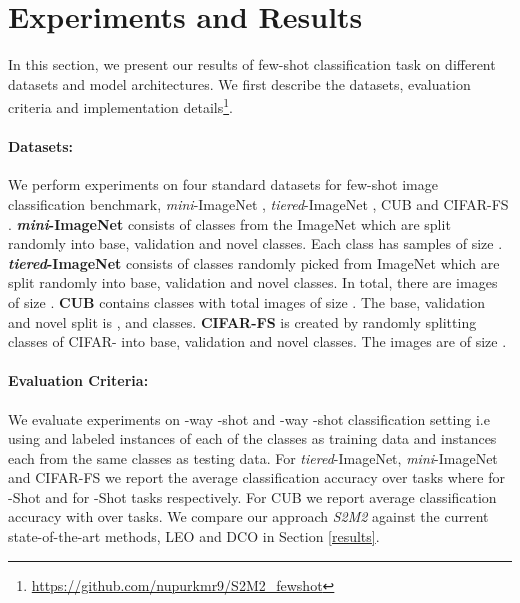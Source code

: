 \documentclass[10pt,twocolumn,letterpaper]{article}
\begin{document}
\section{Experiments and Results}
\label{experiments}
In this section, we present our results of few-shot classification task on different datasets and model architectures. We first describe the datasets, evaluation criteria and implementation details\footnote {\href{https://github.com/nupurkmr9/S2M2\_fewshot}{https://github.com/nupurkmr9/S2M2\_fewshot}}.
\vspace{-8pt}
\paragraph{Datasets:} 
We perform experiments on four standard datasets for few-shot image classification benchmark, \textit{mini}-ImageNet \cite{vinyals2016matching}, \textit{tiered}-ImageNet \cite{tieredImagenet}, CUB \cite{WahCUB_200_2011} and CIFAR-FS \cite{cifar-fs2018Bertinetto}. \textbf{\textit{mini}-ImageNet} consists of  classes from the ImageNet \cite{imagenet2014Russakovsky} which are split randomly into  base,  validation and  novel classes. Each class has  samples of size . \textbf{{\textit{tiered}-ImageNet}}  consists of  classes randomly picked from ImageNet \cite{imagenet2014Russakovsky} which are split randomly into  base,  validation and  novel classes. In total, there are  images of size . \textbf{CUB} contains  classes with total  images of size . The base, validation and novel split is ,  and  classes. \textbf{CIFAR-FS} is created by randomly splitting  classes of CIFAR- \cite{cifar100dataset} into  base,  validation and  novel classes. The images are of size .
\vspace{-8pt}
\paragraph{Evaluation Criteria:} 
We evaluate experiments on -way -shot and -way -shot \cite{vinyals2016matching} classification setting i.e using  and  labeled instances of each of the  classes as training data and  instances each from the same classes as testing data. For {\textit{tiered}-ImageNet}, \textit{mini}-ImageNet and CIFAR-FS we report the average classification accuracy over  tasks where  for -Shot and  for -Shot tasks respectively. For CUB we report average classification accuracy with  over  tasks. We compare our approach \textit{S2M2} against the current state-of-the-art methods, LEO \cite{leo2019} and DCO \cite{dco2019} in Section \ref{results}.
\end{document}
